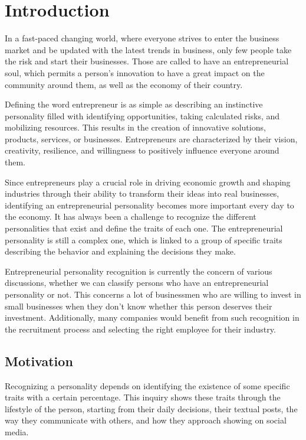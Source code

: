 
%

\chapter{Introduction}
\label{chap:intro}
In a fast-paced changing world, where everyone strives to enter the business market and be updated with the latest trends in business, only few people take the risk and start their businesses. Those are called to have an entrepreneurial soul, which permits a person's innovation to have a great impact on the community around them, as well as the economy of their country. 

Defining the word entrepreneur is as simple as describing an instinctive personality filled with identifying opportunities, taking calculated risks, and mobilizing resources. This results in the creation of innovative solutions, products, services, or businesses. Entrepreneurs are characterized by their vision, creativity, resilience, and willingness to positively influence everyone around them.

Since entrepreneurs play a crucial role in driving economic growth and shaping industries through their ability to transform their ideas into real businesses, identifying an entrepreneurial personality becomes more important every day to the economy. It has always been a challenge to recognize the different personalities that exist and define the traits of each one. The entrepreneurial personality is still a complex one, which is linked to a group of specific traits describing the behavior and explaining the decisions they make.

Entrepreneurial personality recognition is currently the concern of various discussions, whether we can classify persons who have an entrepreneurial personality or not. This concerns a lot of businessmen who are willing to invest in small businesses when they don't know whether this person deserves their investment. Additionally, many companies would benefit from such recognition in the recruitment process and selecting the right employee for their industry.

\section{Motivation}
Recognizing a personality depends on identifying the existence of some specific traits with a certain percentage. This inquiry shows these traits through the lifestyle of the person, starting from their daily decisions, their textual posts, the way they communicate with others, and how they approach showing on social media.

